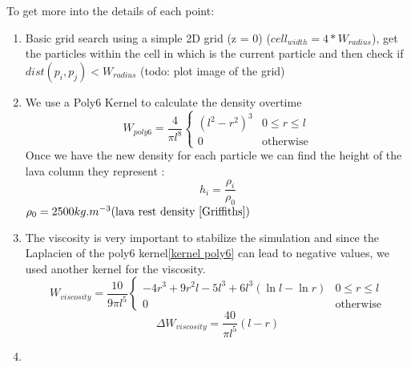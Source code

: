 \begin{flushleft}
To get more into the details of each point:
\end{flushleft}

\begin{enumerate}
    \item Basic grid search using a simple 2D grid (z = 0) (${cell}_{width} = 4*W_{radius}$), get the particles within the cell in which is the current particle and then check if $dist(p_i, p_j) < W_{radius}$ (todo: plot image of the grid)\\

    \item We use a Poly6 Kernel\cite{Solenthaler2011SPHBS} to calculate the density overtime
\begin{equation}\label{kernel poly6}
    W_{poly6} = \frac{4}{\pi l^8}
        \begin{cases} 
            (l^2 - r^2)^3 & 0 \leq r \leq l           
            \\ 0 & \text{otherwise} 
        \end{cases} 
\end{equation}
Once we have the new density for each particle we can find the height of the lava column they represent :
\begin{equation}\label{calcul height}
    h_i = \frac{\rho_i}{\rho_0}
\end{equation}
$\rho_0 = 2500 kg.m^{-3} \text{(lava rest density \cite{Griffiths})}$

    \item The viscosity is very important to stabilize the simulation and since the Laplacien of the poly6 kernel\ref{kernel poly6} can lead to negative values, we used another kernel\cite{Solenthaler2011SPHBS} for the viscosity.
\begin{equation}\label{kernel viscosity}
    W_{viscosity} = \frac{10}{9 \pi l^5}
        \begin{cases} 
            -4r^3 + 9r^2l - 5l^3 + 6l^3(\ln{l} - \ln{r}) & 0 \leq r \leq l           
            \\ 0 & \text{otherwise} 
        \end{cases} 
\end{equation}
\begin{equation}\label{kernel viscosity laplacien}
    \Delta W_{viscosity} = \frac{40}{\pi l^5}(l-r)
\end{equation}

    \item 

\end{enumerate}